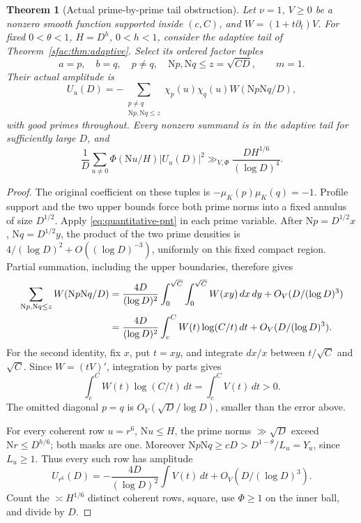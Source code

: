 \documentclass[11pt]{article}
\numberwithin{equation}{section}
\newtheorem{theorem}{Theorem}[section]
\theoremstyle{definition}
\theoremstyle{remark}
\newcommand{\N}{\mathrm N}
\newcommand{\muK}{\mu_K}
\begin{document}
\begin{theorem}[Actual prime-by-prime tail obstruction]
\label{thm:prime-pair-tail}
Let \(\nu=1\), \(V\ge0\) be a nonzero smooth function supported
inside \((c,C)\), and \(W=(1+t\partial_t)V\).
For fixed \(0<\theta<1\), \(H=D^h\), \(0<h<1\), consider the
adaptive tail of Theorem~\ref{sfac:thm:adaptive}.
Select its ordered factor tuples
\[
 a=p,\quad b=q,\quad p\ne q,\quad
 \N p,\N q\le z=\sqrt{CD},\qquad m=1.
\]
Their actual amplitude is
\[
 U_u(D)=-\sum_{\substack{p\ne q\\\N p,\N q\le z}}
       \chi_p(u)\chi_q(u)W(\N p\N q/D),
\]
with good primes throughout. Every nonzero summand is in the adaptive
tail for sufficiently large \(D\), and
\begin{equation}\label{eq:prime-pair-tail-energy}
 \frac1D\sum_{u\ne0}\Phi(\N u/H)|U_u(D)|^2
       \gg_{V,\Phi}\frac{DH^{1/6}}{(\log D)^4}.
\end{equation}
\end{theorem}
\begin{proof}
The original coefficient on these tuples is
\(-\muK(p)\muK(q)=-1\).
Profile support and the two upper bounds force both prime norms
into a fixed annulus of size \(D^{1/2}\).
Apply \eqref{eq:quantitative-pnt} in each prime variable.
After \(\N p=D^{1/2}x\), \(\N q=D^{1/2}y\), the product of the
two prime densities is \(4/(\log D)^2+O((\log D)^{-3})\),
uniformly on this fixed compact region. Partial summation, including
the upper boundaries, therefore gives
\begin{align}
 \sum_{\N p,\N q\le z}W(\N p\N q/D)
 &=\frac{4D}{(\log D)^2}
     \int_0^{\sqrt C}\int_0^{\sqrt C}W(xy)\,dx\,dy
          +O_V(D/(\log D)^3)\notag\\
 &=\frac{4D}{(\log D)^2}
     \int_c^CW(t)\log(C/t)\,dt+O_V(D/(\log D)^3).
 \label{eq:prime-pair-asymptotic}
\end{align}
For the second identity, fix \(x\), put \(t=xy\), and integrate
\(dx/x\) between \(t/\sqrt C\) and \(\sqrt C\).
Since \(W=(tV)'\), integration by parts gives
\[
 \int_c^CW(t)\log(C/t)\,dt=\int_c^CV(t)\,dt>0.
\]
The omitted diagonal \(p=q\) is \(O_V(\sqrt D/\log D)\),
smaller than the error above.

For every coherent row \(u=r^6\), \(\N u\le H\), the prime
norms \(\gg\sqrt D\) exceed \(\N r\le D^{h/6}\);
both masks are one. Moreover
\(\N p\N q\ge cD>D^{1-\theta}/L_u=Y_u\), since \(L_u\ge1\).
Thus every such row has amplitude
\[
 U_{r^6}(D)
 =-\frac{4D}{(\log D)^2}\int V(t)\,dt
       +O_V(D/(\log D)^3).
\]
Count the \(\asymp H^{1/6}\) distinct coherent rows, square,
use \(\Phi\ge1\) on the inner ball, and divide by \(D\).
\end{proof}
\end{document}
